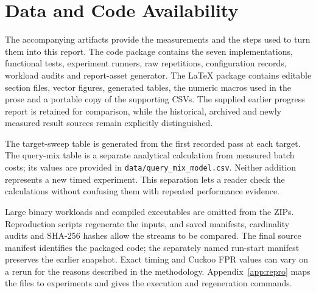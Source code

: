 \documentclass[10pt,a4paper]{article}
\begin{document}
\section*{Data and Code Availability}
The accompanying artifacts provide the measurements and the steps used to turn them into this report. The code package contains the seven implementations, functional tests, experiment runners, raw repetitions, configuration records, workload audits and report-asset generator. The LaTeX package contains editable section files, vector figures, generated tables, the numeric macros used in the prose and a portable copy of the supporting CSVs. The supplied earlier progress report is retained for comparison, while the historical, archived and newly measured result sources remain explicitly distinguished.

The target-sweep table is generated from the first recorded pass at each target. The query-mix table is a separate analytical calculation from measured batch costs; its values are provided in \nolinkurl{data/query_mix_model.csv}. Neither addition represents a new timed experiment. This separation lets a reader check the calculations without confusing them with repeated performance evidence.

Large binary workloads and compiled executables are omitted from the ZIPs. Reproduction scripts regenerate the inputs, and saved manifests, cardinality audits and SHA-256 hashes allow the streams to be compared. The final source manifest identifies the packaged code; the separately named run-start manifest preserves the earlier snapshot. Exact timing and Cuckoo FPR values can vary on a rerun for the reasons described in the methodology. Appendix~\ref{app:repro} maps the files to experiments and gives the execution and regeneration commands.

\begingroup
\normalsize
\raggedright
\setlength{\bibsep}{7pt}
\setlength{\parskip}{0pt}


\endgroup
\clearpage
\appendix

\end{document}

